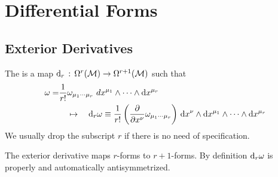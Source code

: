 \documentclass[a4paper, 10pt]{article}
\begin{document}
\setcounter{section}{6}
\section{Differential Forms}

\setcounter{subsection}{1}
\subsection{Exterior Derivatives}

\setcounter{theorem}{13}

\begin{definition}
    The  is a map $\mathrm{d}_{r} \,:\, \Omega^{r}(\mathcal{M}) \rightarrow \Omega^{r+1}(\mathcal{M})$ such that
    \begin{align*}
        \omega = & \frac{1}{r!}\omega_{\mu_{1}\cdots\mu_{r}}\,\,d{x}^{\mu_{1}} \wedge \cdots \wedge \mathrm{d}{x}^{\mu_{r}} \\
        &\quad \mapsto \quad \mathrm{d}_{r}\omega \equiv \frac{1}{r!} \left(\frac{\partial}{\partial{x}^{\nu}}\omega_{\mu_{1}\cdots\mu_{r}}\right) \, \mathrm{d}{x}^{\nu} \wedge \mathrm{d}{x}^{\mu_{1}} \wedge \cdots \wedge \mathrm{d}{x}^{\mu_{r}}
    \end{align*}
    We usually drop the subscript $r$ if there is no need of specification.
\end{definition}

\begin{remark}
    The exterior derivative maps $r$-forms to $r+1$-forms. By definition $\mathrm{d}_{r}\omega$ is properly and automatically antisymmetrized.
\end{remark}
\end{document}
